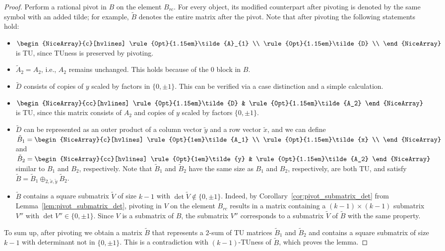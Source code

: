 \documentclass{article}
\theoremstyle{definition}
\begin{document}
\begin{proof}
    Perform a rational pivot in $B$ on the element $B_{rc}$. For every object, its modified counterpart after pivoting is denoted by the same symbol with an added tilde; for example, $\tilde{B}$ denotes the entire matrix after the pivot. Note that after pivoting the following statements hold:
    \begin{itemize}
        \item $\begin{NiceArray}{c}[hvlines] \rule{0pt}{1.15em}\tilde{A}_{1} \\ \rule{0pt}{1.15em}\tilde{D} \\ \end{NiceArray}$ is TU, since TUness is preserved by pivoting.
        \item $\tilde{A}_{2} = A_{2}$, i.e., $A_{2}$ remains unchanged. This holds because of the $0$ block in $B$.
        \item $\tilde{D}$ consists of copies of $y$ scaled by factors in $\{0, \pm 1\}$. This can be verified via a case distinction and a simple calculation.
        \item $\begin{NiceArray}{cc}[hvlines] \rule{0pt}{1.15em}\tilde{D} & \rule{0pt}{1.15em}\tilde{A_2} \end{NiceArray}$ is TU, since this matrix consists of $A_{2}$ and copies of $y$ scaled by factors $\{0, \pm 1\}$.
        \item $\tilde{D}$ can be represented as an outer product of a column vector $\tilde{y}$ and a row vector $\tilde{x}$, and we can define $\tilde{B}_{1} = \begin{NiceArray}{c}[hvlines] \rule{0pt}{1em}\tilde{A_1} \\ \rule{0pt}{1.15em}\tilde{x} \\ \end{NiceArray}$ and $\tilde{B}_{2} =\begin{NiceArray}{cc}[hvlines] \rule{0pt}{1em}\tilde{y} & \rule{0pt}{1.15em}\tilde{A_2} \end{NiceArray}$ similar to $B_{1}$ and $B_{2}$, respectively. Note that $\tilde{B}_{1}$ and $\tilde{B}_{2}$ have the same size as $B_{1}$ and $B_{2}$, respectively, are both TU, and satisfy $\tilde{B} = \tilde{B}_{1} \oplus_{2, \tilde{x}, \tilde{y}} \tilde{B}_{2}$.
        \item $\tilde{B}$ contains a square submatrix $\tilde{V}$ of size $k - 1$ with $\det \tilde{V} \notin \{0, \pm 1\}$. Indeed, by Corollary~\ref{cor:pivot_submatrix_det} from Lemma~\ref{lem:pivot_submatrix_det}, pivoting in $V$ on the element $B_{rc}$ results in a matrix containing a $(k - 1) \times (k - 1)$ submatrix $V''$ with $\det V'' \in \{0, \pm 1\}$. Since $V$ is a submatrix of $B$, the submatrix $V''$ corresponds to a submatrix $\tilde{V}$ of $\tilde{B}$ with the same property.
    \end{itemize}
    To sum up, after pivoting we obtain a matrix $\tilde{B}$ that represents a $2$-sum of TU matrices $\tilde{B}_{1}$ and $\tilde{B}_{2}$ and contains a square submatrix of size $k - 1$ with determinant not in $\{0, \pm 1\}$. This is a contradiction with $(k - 1)$-TUness of $\tilde{B}$, which proves the lemma.
\end{proof}
\end{document}
